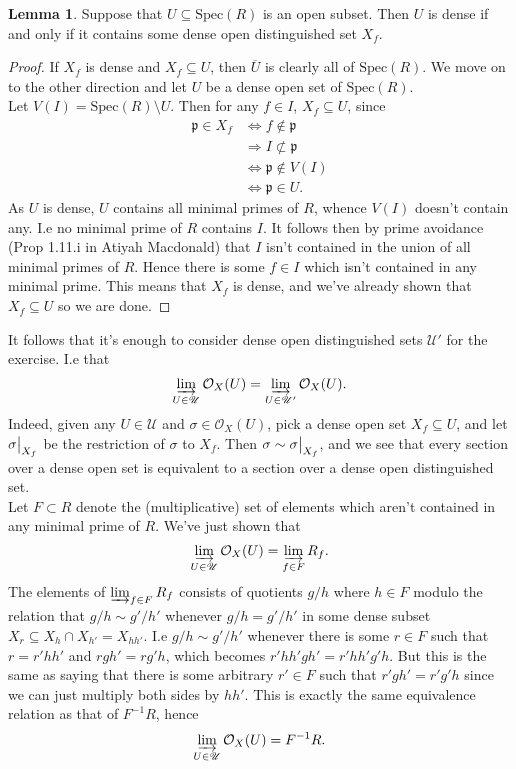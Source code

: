\documentclass{article}
\newcommand\restr[2]{{%
  \left.\kern-\nulldelimiterspace %
  #1 %
  \vphantom{\big|} %
  \right|_{#2} %
  }}
\theoremstyle{definition}
\newtheorem{lemma}[theorem]{Lemma}
\newcommand{\Spec}{\text{Spec}}
\begin{document}
\begin{lemma}
	Suppose that $U \subseteq \Spec(R)$ is an open subset. Then $U$ is dense if
	and only if it contains some dense open distinguished set $X_f$.
\end{lemma}
\begin{proof}
	If $X_f$ is dense and $X_f \subseteq U$, then $\overline{U}$ is clearly all
	of $\Spec(R)$. We move on to the other direction and let $U$ be a dense
	open set of $\Spec(R)$. \\

	Let $V(I) = \Spec(R) \setminus U$. Then for any $f \in I$,
	$X_f \subseteq U$, since 
	\begin{align*}
		\mathfrak{p} \in X_f
		&\Leftrightarrow
		f \not \in \mathfrak{p} \\
		& \Rightarrow
		I \not \subset \mathfrak{p} \\
		&\Leftrightarrow
		\mathfrak{p} \not \in V(I) \\
		&\Leftrightarrow
		\mathfrak{p} \in U.
	\end{align*} 
	As $U$ is dense, $U$ contains all minimal primes of $R$, whence $V(I)$
	doesn't contain any. I.e no minimal prime of $R$ contains $I$. It follows
	then by prime avoidance (Prop 1.11.i in Atiyah Macdonald) that $I$ isn't
	contained in the union of all minimal primes of $R$. Hence there is some $f
	\in I$ which isn't contained in any minimal prime. This means that $X_f$ is
	dense, and we've already shown that $X_f \subseteq U$ so we are done.
\end{proof}

It follows that it's enough to consider dense open distinguished sets
$\mathscr{U}'$ for the exercise. I.e that 
\[
	\varinjlim_{U \in \mathscr{U}}
	\mathcal{O}_X(U)
	=
	\varinjlim_{U \in \mathscr{U'}}
	\mathcal{O}_X(U).
\] 
Indeed, given any $U \in \mathscr{U}$ and $\sigma \in \mathscr{O}_X(U)$, pick a
dense open set $X_f \subseteq U$, and let $\restr{\sigma}{X_f}$ be the
restriction of $\sigma$ to $X_f$. Then $\sigma \sim \restr{\sigma}{X_f}$, and
we see that every section over a dense open set is equivalent to a section over
a dense open distinguished set. \\

Let $F \subset R$ denote the (multiplicative) set of elements which aren't
contained in any minimal prime of $R$. We've just shown that
\[
	\varinjlim_{U \in \mathscr{U}}
	\mathcal{O}_X(U)
	=
	\varinjlim_{f \in F}
	R_f.
\] 
The elements of $\varinjlim_{f \in F} R_f$ consists of quotients $g/h$ where $h
\in F$ modulo the relation that $g/h \sim g'/h'$ whenever $g/h = g'/h'$ in some
dense subset $X_r \subseteq X_h \cap X_{h'} = X_{hh'}$. I.e $g/h \sim g'/h'$
whenever there is some $r \in F$ such that $r = r'hh'$ and $rgh' = rg'h$, which
becomes $r'hh'gh' = r'hh'g'h$. But this is the same as saying that there is
some arbitrary $r' \in F$ such that $r'gh' = r'g'h$ since we can just multiply
both sides by $hh'$. This is exactly the same equivalence relation as that of
$F^{-1}R$, hence
\[
	\varinjlim_{U \in \mathscr{U}}
	\mathcal{O}_X(U)
	=
	F^{-1}R.
\] 
\end{document}
